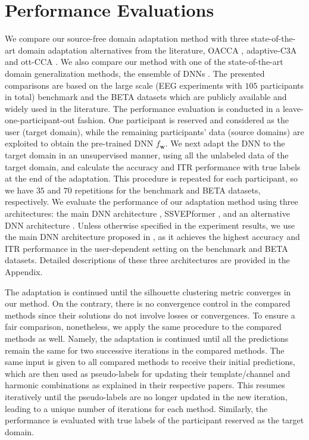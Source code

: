 \documentclass[12pt]{iopart}
\newcommand{\matr}[1]{\mathbf{#1}}
\begin{document}
\section{Performance Evaluations} \label{sec:evaluations}
We compare our source-free domain adaptation method with three state-of-the-art domain adaptation alternatives from the literature, OACCA \cite{oacca}, adaptive-C3A \cite{comb-tCCA} and ott-CCA \cite{tt-CCA}. {We also compare our method with one of the state-of-the-art domain generalization methods, the ensemble of DNNs \cite{our_ensemble}.} The presented comparisons are based on the large scale (EEG experiments with $105$ participants in total) benchmark \cite{benchmark_Dataset} and the BETA \cite{beta} datasets which are publicly available and widely used in the literature. The performance evaluation is conducted in a leave-one-participant-out fashion. One participant is reserved and considered as the user (target domain), while the remaining participants' data (source domains) are exploited to obtain the pre-trained DNN $f_\matr{w}$. We next adapt the DNN to the target domain in an unsupervised manner, using all the unlabeled data of the target domain, and calculate the accuracy and ITR performance with true labels at the end of the adaptation. This procedure is repeated for each participant, so we have $35$ and $70$ repetitions for the benchmark and BETA datasets, respectively. We evaluate the performance of our adaptation method using three architectures: the main DNN architecture \cite{ournetwork}, SSVEPformer \cite{ssvepformer}, and an alternative DNN architecture \cite{another_network}. Unless otherwise specified in the experiment results, we use the main DNN architecture proposed in \cite{ournetwork}, as it achieves the highest accuracy and ITR performance in the user-dependent setting on the benchmark \cite{benchmark_Dataset} and BETA \cite{beta} datasets. Detailed descriptions of these three architectures are provided in the Appendix.

The adaptation is continued until the silhouette clustering metric converges in our method. On the contrary, there is no convergence control in the compared methods since their solutions do not involve losses or convergences. To ensure a fair comparison, nonetheless, we apply the same procedure to the compared methods as well. Namely, the adaptation is continued until all the predictions remain the same for two successive iterations in the compared methods. The same input is given to all compared methods to receive their initial predictions, which are then used as pseudo-labels for updating their template/channel and harmonic combinations as explained in their respective papers. This resumes iteratively until the pseudo-labels are no longer updated in the new iteration, leading to a unique number of iterations for each method. Similarly, the performance is evaluated with true labels of the participant reserved as the target domain.
\end{document}
